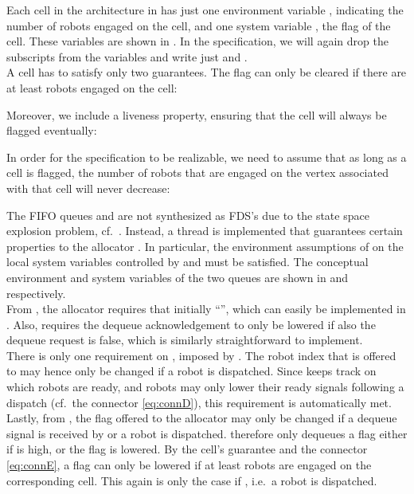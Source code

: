 Each cell  in the architecture in  has just one environment variable , indicating the number of robots engaged on the cell, and one system variable , the flag of the cell. These variables are shown in . In the specification, we will again drop the subscripts from the variables and write just  and .\\

A cell has to satisfy only two guarantees. The flag can only be cleared if there are at least  robots engaged on the cell:

Moreover, we include a liveness property, ensuring that the cell will always be flagged eventually:


In order for the specification to be realizable, we need to assume that as long as a cell is flagged, the number of robots that are engaged on the vertex associated with that cell will never decrease:


The FIFO queues  and  are not synthesized as FDS's due to the state space explosion problem, cf.\ . Instead, a thread is implemented that guarantees certain properties to the allocator . In particular, the environment assumptions of  on the local system variables controlled by  and  must be satisfied. The conceptual environment and system variables of the two queues are shown in  and  respectively.\\

From , the allocator requires that initially ``'', which can easily be implemented in . Also,  requires the dequeue acknowledgement  to only be lowered if also the dequeue request  is false, which is similarly straightforward to implement.\\

There is only one requirement on , imposed by . The robot index  that is offered to  may hence only be changed if a robot is dispatched. Since  keeps track on which robots are ready, and robots may only lower their ready signals  following a dispatch  (cf.\ the connector \eqref{eq:connD}), this requirement is automatically met.\\

Lastly, from , the flag offered to the allocator may only be changed if a dequeue signal  is received by  or a robot is dispatched.  therefore only dequeues a flag either if  is high, or the flag is lowered. By the cell's guarantee  and the connector \eqref{eq:connE}, a flag can only be lowered if at least  robots are engaged on the corresponding cell. This again is only the case if , i.e.\ a robot is dispatched.\\


